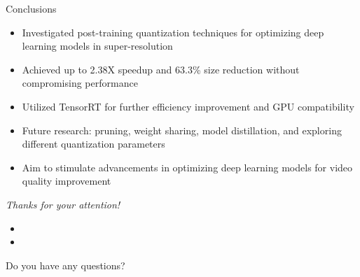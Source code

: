 \documentclass{beamer}
\begin{document}
\begin{frame}{Conclusions}
\begin{itemize}
  \item Investigated post-training quantization techniques for optimizing deep learning models in super-resolution
  \item Achieved up to 2.38X speedup and 63.3\% size reduction without compromising performance
  \item Utilized TensorRT for further efficiency improvement and GPU compatibility
  \item Future research: pruning, weight sharing, model distillation, and exploring different quantization parameters
  \item Aim to stimulate advancements in optimizing deep learning models for video quality improvement
\end{itemize}
\end{frame}

\begin{frame}[c,noframenumbering]

  {\Huge \emph{Thanks for your attention!}}

  \begin{itemize}
    \item[]
    \item[]
  \end{itemize}

  \LARGE Do you have any questions?

\end{frame}
\end{document}
